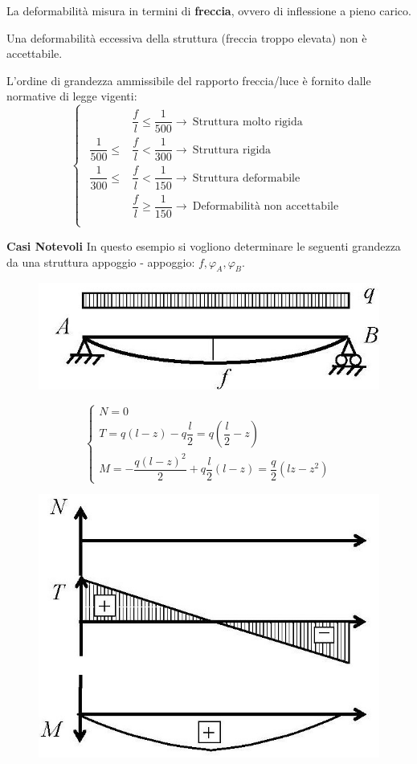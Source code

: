 \documentclass{article}
\begin{document}
\begin{adjustwidth}{2in}{}
		La deformabilità misura in termini di
		\textbf{freccia}, ovvero di inflessione a pieno carico. \newline
		
		Una deformabilità eccessiva della struttura (freccia troppo elevata) non è
		accettabile.\newline 
		
		L’ordine di grandezza ammissibile del rapporto freccia/luce è fornito dalle normative di legge vigenti:
		\[
			\begin{cases}
				\begin{aligned}
					& \dfrac{f}{l} \le \dfrac{1}{500}	\rightarrow ~ \text{Struttura molto rigida} \\
					\dfrac{1}{500} \le & \dfrac{f}{l} < \dfrac{1}{300} \rightarrow ~ \text{Struttura rigida} \\
					\dfrac{1}{300} \le & \dfrac{f}{l} < \dfrac{1}{150}	\rightarrow ~ \text{Struttura deformabile} \\
					& \dfrac{f}{l} \ge \dfrac{1}{150}	\rightarrow ~ \text{Deformabilità non accettabile} \\
				\end{aligned}
			\end{cases}
		\]
		
{\Large \textbf{Casi Notevoli}} \mbox{} \newline
		In questo esempio si vogliono determinare le seguenti grandezza da una struttura appoggio - appoggio: $f, \varphi_A, \varphi_B$.

\begin{figure}[H]
	\centering
	\includegraphics[width=0.4\linewidth]{"immagini/1.PARTE8_Pagina_25 (2)"}
\end{figure}

		\[
		\begin{cases}			
				N = 0\\
				T = q(l-z) - q\dfrac{l}{2} = q\left( \dfrac{l}{2} - z\right)  \\
				M = - \dfrac{q(l-z)^2}{2} + q\dfrac{l}{2}(l-z) = \dfrac{q}{2}(lz -z^2)		
		\end{cases}
		\]

\begin{figure}[H]
	\centering
	\includegraphics[width=0.4\linewidth]{"immagini/1.PARTE8_Pagina_25"}
\end{figure}


\end{adjustwidth}
\end{document}
